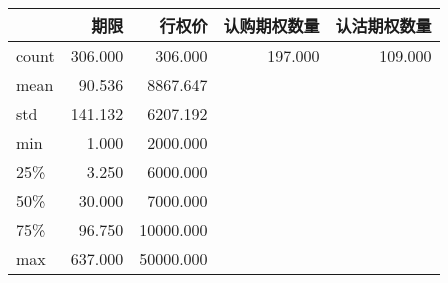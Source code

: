 \begin{tabular}{lrrrr}
\toprule
{} &      期限 &       行权价 &  认购期权数量 &  认沽期权数量 \\
\midrule
count & 306.000 &   306.000 & 197.000 & 109.000 \\
mean  &  90.536 &  8867.647 &         &         \\
std   & 141.132 &  6207.192 &         &         \\
min   &   1.000 &  2000.000 &         &         \\
25\%   &   3.250 &  6000.000 &         &         \\
50\%   &  30.000 &  7000.000 &         &         \\
75\%   &  96.750 & 10000.000 &         &         \\
max   & 637.000 & 50000.000 &         &         \\
\bottomrule
\end{tabular}
